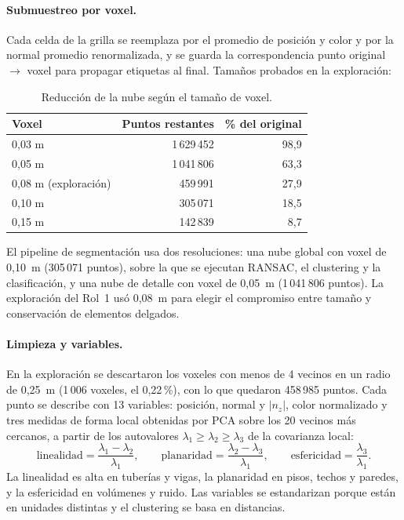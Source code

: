 \documentclass[11pt,a4paper]{article}
\begin{document}
\paragraph{Submuestreo por voxel.} Cada celda de la grilla se reemplaza por el promedio de posición y color y por la normal promedio renormalizada, y se guarda la correspondencia punto original $\to$ voxel para propagar etiquetas al final. Tamaños probados en la exploración:

\begin{table}[H]
\centering
\begin{tabular}{lrr}
\toprule
Voxel & Puntos restantes & \% del original \\
\midrule
0,03 m & 1\,629\,452 & 98,9 \\
0,05 m & 1\,041\,806 & 63,3 \\
0,08 m (exploración) & 459\,991 & 27,9 \\
0,10 m & 305\,071 & 18,5 \\
0,15 m & 142\,839 & 8,7 \\
\bottomrule
\end{tabular}
\caption{Reducción de la nube según el tamaño de voxel.}
\end{table}

El pipeline de segmentación usa dos resoluciones: una nube global con voxel de 0,10~m (305\,071 puntos), sobre la que se ejecutan RANSAC, el clustering y la clasificación, y una nube de detalle con voxel de 0,05~m (1\,041\,806 puntos). La exploración del Rol~1 usó 0,08~m para elegir el compromiso entre tamaño y conservación de elementos delgados.

\paragraph{Limpieza y variables.} En la exploración se descartaron los voxeles con menos de 4 vecinos en un radio de 0,25~m (1\,006 voxeles, el 0,22\,\%), con lo que quedaron 458\,985 puntos. Cada punto se describe con 13 variables: posición, normal y $|n_z|$, color normalizado y tres medidas de forma local obtenidas por PCA sobre los 20 vecinos más cercanos, a partir de los autovalores $\lambda_1\ge\lambda_2\ge\lambda_3$ de la covarianza local:
\[
\text{linealidad}=\frac{\lambda_1-\lambda_2}{\lambda_1},\qquad
\text{planaridad}=\frac{\lambda_2-\lambda_3}{\lambda_1},\qquad
\text{esfericidad}=\frac{\lambda_3}{\lambda_1}.
\]
La linealidad es alta en tuberías y vigas, la planaridad en pisos, techos y paredes, y la esfericidad en volúmenes y ruido. Las variables se estandarizan porque están en unidades distintas y el clustering se basa en distancias.
\end{document}
